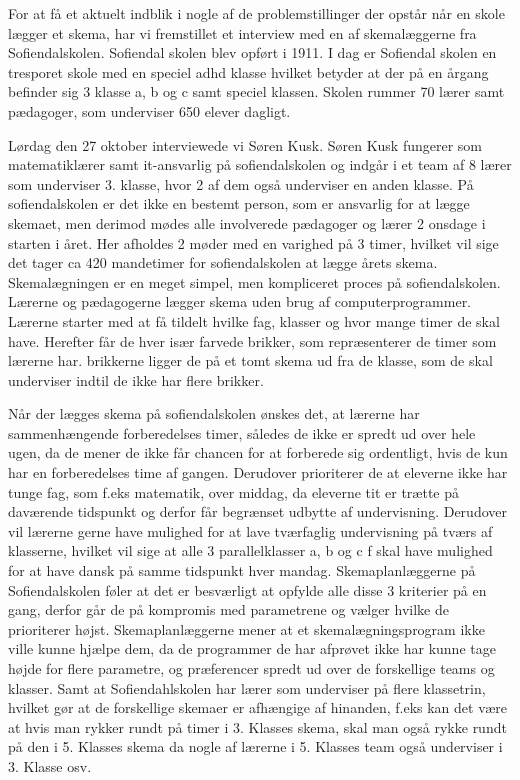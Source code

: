 For at få et aktuelt indblik i nogle af de problemstillinger der opstår når en skole lægger et skema, har vi fremstillet et interview med en af skemalæggerne fra Sofiendalskolen.
Sofiendal skolen blev opført i 1911. I dag er Sofiendal skolen en tresporet skole med en speciel adhd klasse hvilket betyder at der på en årgang befinder sig 3 klasse a, b og c samt speciel klassen. Skolen rummer 70 lærer samt pædagoger, som underviser 650 elever dagligt. 

Lørdag den 27 oktober interviewede vi Søren Kusk. Søren Kusk fungerer som matematiklærer samt it-ansvarlig på sofiendalskolen og indgår i et team af 8 lærer som underviser 3. klasse, hvor 2 af dem også underviser en anden klasse. På sofiendalskolen er det ikke en bestemt person, som er ansvarlig for at lægge skemaet, men derimod mødes alle involverede pædagoger og lærer 2 onsdage i starten i året. Her afholdes 2 møder med en varighed på 3 timer, hvilket vil sige det tager ca 420 mandetimer for sofiendalskolen at lægge årets skema. Skemalægningen er en meget simpel, men kompliceret proces på sofiendalskolen. Lærerne og pædagogerne lægger skema uden brug af computerprogrammer. Lærerne starter med at få tildelt hvilke fag, klasser og hvor mange timer de skal have. Herefter får de hver især farvede brikker, som repræsenterer de timer som lærerne har. brikkerne ligger de på et tomt skema ud fra de klasse, som de skal underviser indtil de ikke har flere brikker. 

Når der lægges skema på sofiendalskolen ønskes det, at lærerne har sammenhængende forberedelses timer, således de ikke er spredt ud over hele ugen, da de mener de ikke får chancen for at forberede sig ordentligt, hvis de kun har en forberedelses time af gangen. Derudover prioriterer de at eleverne ikke har tunge fag, som f.eks matematik, over middag, da eleverne tit er trætte på daværende tidspunkt og derfor får begrænset udbytte af undervisning. Derudover vil lærerne gerne have mulighed for at lave tværfaglig undervisning på tværs af klasserne, hvilket vil sige at alle 3 parallelklasser a, b og c f skal have mulighed for at have dansk på samme tidspunkt hver mandag. Skemaplanlæggerne på Sofiendalskolen føler at det er besværligt at opfylde alle disse 3 kriterier på en gang, derfor går de på kompromis med parametrene og vælger hvilke de prioriterer højst. Skemaplanlæggerne mener at et skemalægningsprogram ikke ville kunne hjælpe dem, da de programmer de har afprøvet ikke har kunne tage højde for flere parametre, og præferencer spredt ud over de forskellige teams og klasser. Samt at Sofiendahlskolen har lærer som underviser på flere klassetrin, hvilket gør at de forskellige skemaer er afhængige af hinanden, f.eks kan det være at hvis man rykker rundt på timer i 3. Klasses skema, skal man også rykke rundt på den i 5. Klasses skema da nogle af lærerne i 5. Klasses team også underviser i 3. Klasse osv. 

